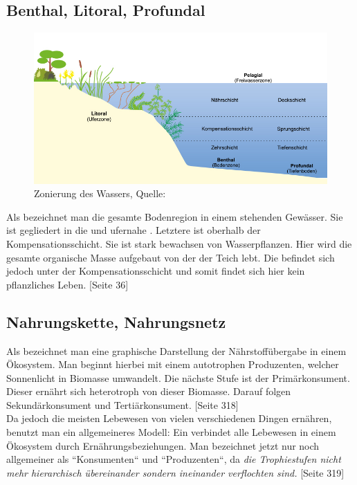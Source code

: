\documentclass{article}
\begin{document}
    \subsection{Benthal, Litoral, Profundal}
    
        \begin{figure}[h!]
        \centering
        \includegraphics[scale=0.4]{zonierung.jpg}
        \caption{Zonierung des Wassers, Quelle: \cite{klasseWasser}}
        \label{fig:universe}
        \end{figure}
        
    
        Als  bezeichnet man die gesamte Bodenregion in einem stehenden Gewässer. \cite{Was} Sie ist gegliedert in die  und ufernahe . Letztere ist oberhalb der Kompensationsschicht. Sie ist stark bewachsen von Wasserpflanzen. Hier wird die gesamte organische Masse aufgebaut von der der Teich lebt. Die  befindet sich jedoch unter der Kompensationsschicht und somit findet sich hier kein pflanzliches Leben. \cite{Was} [Seite 36]
    
    \subsection{Nahrungskette, Nahrungsnetz}
    
        Als  bezeichnet man eine graphische Darstellung der Nährstoffübergabe in einem Ökosystem.  Man beginnt hierbei mit einem autotrophen Produzenten, welcher Sonnenlicht in Biomasse umwandelt. Die nächste Stufe ist der Primärkonsument. Dieser ernährt sich heterotroph von dieser Biomasse. Darauf folgen Sekundärkonsument und Tertiärkonsument. \cite{Biobuch} [Seite 318] \\
        \vspace{5mm}
        Da jedoch die meisten Lebewesen von vielen verschiedenen Dingen ernähren, benutzt man ein allgemeineres Modell: Ein  verbindet alle Lebewesen in einem Ökosystem durch Ernährungsbeziehungen. Man bezeichnet jetzt nur noch allgemeiner als ``Konsumenten`` und ``Produzenten``, da \textit{die Trophiestufen nicht mehr hierarchisch übereinander sondern ineinander verflochten sind.} \cite{Biobuch} [Seite 319]
    
\end{document}
